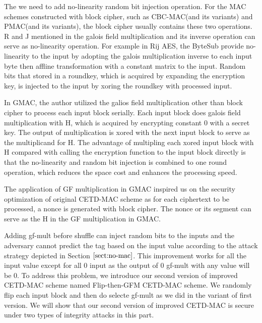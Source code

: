 The we need to add no-linearity random bit injection operation. For the MAC
schemes constructed with block cipher, such as CBC-MAC(and its variants) and
PMAC(and its variants), the block cipher usually contains these two operations.
R and J mentioned in \cite{aes1999} the galois field multiplication and its inverse
operation can serve as no-linearity operation. 
For example in Rij AES, the ByteSub provide no-linearity to the input by
adopting the galois multiplication inverse to each input byte then affline
transformation with a constant matrix to the input. Random bits that stored in a
roundkey, which is acquired by expanding the encryption key, is injected to the
input by xoring the roundkey with processed input.  

In GMAC, the author utilized the galios field multiplication other than block
cipher to process each input block serially. Each input block does galois field
multiplication with H, which is acquired by encrypting constant 0 with a secret
key. The output of multiplication is xored with the next input block to serve as
the multiplicand for H. The advantage of multipling each xored input block with
H compared with calling the encryption function to the input block directly is
that the no-linearity and random bit injection is combined to one round
operation, which reduces the space cost and enhances the processing speed.

The application of GF multiplication in GMAC inspired us on the security
optimization of original CETD-MAC scheme as for each ciphertext to be processed,
a nonce is generated with block cipher. The nonce or its segment can serve as
the H in the GF multiplication in GMAC. 

Adding gf-mult before shuffle can inject random bits to the inputs and the
adversary cannot predict the tag based on the input value according to the
attack strategy depicted in Section $\ref{sect:no-mac}$. This improvement works for all
the input value except for all 0 input as the output of 0 gf-mult with any value
will be 0. To address this problem, we introduce our second version of improved
CETD-MAC scheme named Flip-then-GFM CETD-MAC scheme. We randomly flip each input
block and then do selecte gf-mult as we did in the variant of first version. We
will show that our second version of improved CETD-MAC is secure under two types
of integrity attacks in this part. 

